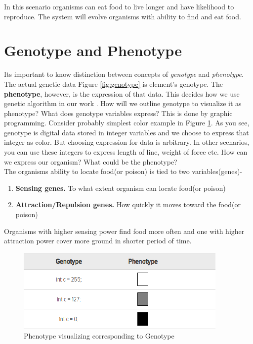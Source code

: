 \documentclass[conference]{IEEEtran}
\begin{document}
In this scenario organisms can eat food to live longer and have likelihood to reproduce. The system will evolve organisms with ability to find and eat food.

\section{Genotype and Phenotype}
Its important to know distinction between concepts of \textit{genotype} and \textit{phenotype}. The actual genetic data Figure \ref{fig:genotype} is element's genotype. The \textbf{phenotype}, however, is the expression of that data. This decides how we use genetic algorithm in our work \cite{mapping-genotype-phenotype}. How will we outline genotype to visualize it as phenotype? What does genotype variables express? This is done by graphic programming. Consider probably simplest color example in Figure \ref{fig:genotype-and-phenotype}. As you see, genotype is digital data stored in integer variables and we choose to express that integer as color. But choosing expression for data is arbitrary. In other scenarios, you can use these integers to express length of line, weight of force etc. How can we express our organism? What could be the phenotype?\\
The organisms ability to locate food(or poison) is tied to two variables(genes)-
\begin{enumerate}
\item \textbf{Sensing genes.} To what extent organism can locate food(or poison)
\item \textbf{Attraction/Repulsion genes.} How quickly it moves toward the food(or poison)
\end{enumerate}
Organisms with higher sensing power find food more often and one with higher attraction power cover more ground in shorter period of time.
\begin{figure}
	\includegraphics[scale=1]{genotype-and-phenotype.png}
	\caption{Phenotype visualizing corresponding to Genotype}
	\label{fig:genotype-and-phenotype}
\end{figure}
\end{document}
